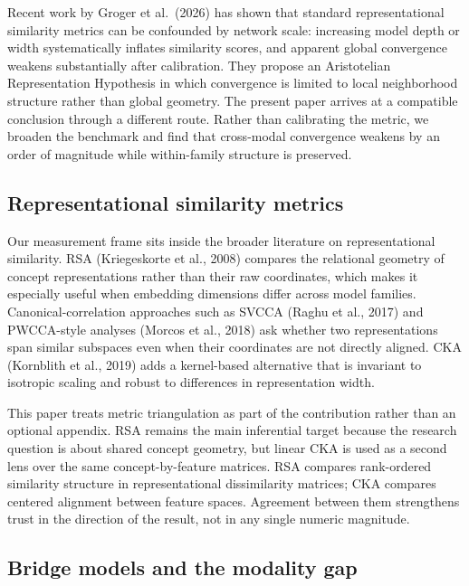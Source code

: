 \documentclass[11pt,a4paper]{article}
\begin{document}
Recent work by Groger et al.~(2026) has shown that standard
representational similarity metrics can be confounded by network scale:
increasing model depth or width systematically inflates similarity
scores, and apparent global convergence weakens substantially after
calibration. They propose an Aristotelian Representation Hypothesis in
which convergence is limited to local neighborhood structure rather than
global geometry. The present paper arrives at a compatible conclusion
through a different route. Rather than calibrating the metric, we
broaden the benchmark and find that cross-modal convergence weakens by
an order of magnitude while within-family structure is preserved.

\subsection{Representational similarity
metrics}\label{representational-similarity-metrics}

Our measurement frame sits inside the broader literature on
representational similarity. RSA (Kriegeskorte et al., 2008) compares
the relational geometry of concept representations rather than their raw
coordinates, which makes it especially useful when embedding dimensions
differ across model families. Canonical-correlation approaches such as
SVCCA (Raghu et al., 2017) and PWCCA-style analyses (Morcos et al.,
2018) ask whether two representations span similar subspaces even when
their coordinates are not directly aligned. CKA (Kornblith et al., 2019)
adds a kernel-based alternative that is invariant to isotropic scaling
and robust to differences in representation width.

This paper treats metric triangulation as part of the contribution
rather than an optional appendix. RSA remains the main inferential
target because the research question is about shared concept geometry,
but linear CKA is used as a second lens over the same concept-by-feature
matrices. RSA compares rank-ordered similarity structure in
representational dissimilarity matrices; CKA compares centered alignment
between feature spaces. Agreement between them strengthens trust in the
direction of the result, not in any single numeric magnitude.

\subsection{Bridge models and the modality
gap}\label{bridge-models-and-the-modality-gap}
\end{document}
